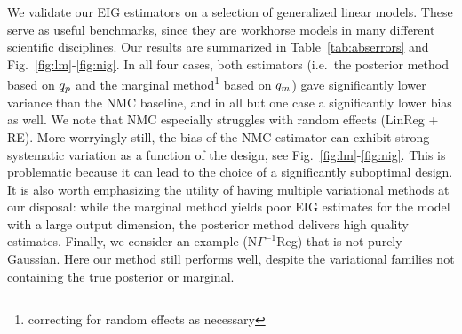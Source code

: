 We validate our EIG estimators on a selection of generalized linear models. These serve as useful benchmarks, since they are workhorse models in many different scientific disciplines. Our results are summarized in Table~\ref{tab:abserrors} and Fig.~\ref{fig:lm}-\ref{fig:nig}. In all four cases, both estimators
(i.e.~the posterior method based on $q_p$ and the marginal method\footnote{correcting for random effects as necessary} based on $q_m$) 
gave significantly lower variance than the NMC baseline, and in all but one case a
significantly lower bias as well. We note that NMC especially struggles with random effects (LinReg + RE). More worryingly still, the bias of the NMC estimator can exhibit strong systematic variation as a function of the design, see Fig.~\ref{fig:lm}-\ref{fig:nig}. This is problematic because it can lead to the choice of a significantly suboptimal design. It is also worth emphasizing the utility of having multiple variational methods at our disposal: while the marginal method yields poor EIG estimates for the model with a large output dimension, the posterior method delivers high quality estimates. 
Finally, we consider an example (N$\Gamma^{-1}$Reg) that is not purely Gaussian. Here our method still performs well, despite the variational families not containing the true posterior or marginal.

%

